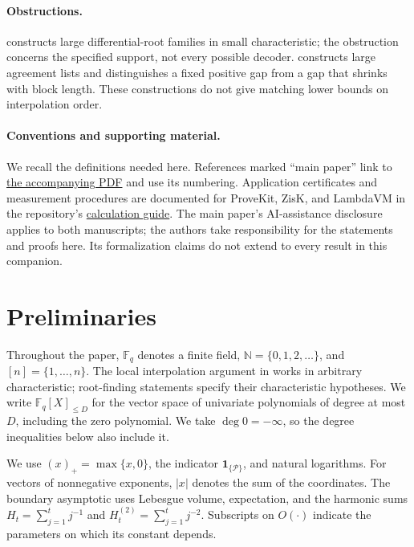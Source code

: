 \documentclass[11pt,letterpaper]{article}
\theoremstyle{definition}
\newcommand{\F}{\mathbb{F}}
\newcommand{\N}{\mathbb{N}}
\begin{document}
\paragraph{Obstructions.}
 constructs large differential-root families in
small characteristic; the obstruction concerns the specified support,
not every possible decoder.  constructs large agreement
lists and distinguishes a fixed positive gap from a gap that shrinks with
block length. These constructions do not give matching lower bounds on
interpolation order.

\paragraph{Conventions and supporting material.}
We recall the definitions needed here. References marked ``main paper''
link to \href{rs-beyond-johnson.pdf}{the accompanying PDF} and use its
numbering. Application certificates and measurement procedures are documented
for ProveKit, ZisK, and LambdaVM in the repository's
\href{https://github.com/quangvdao/rs-beyond-johnson/blob/main/CALCULATIONS.md}{calculation guide}. The main paper's AI-assistance disclosure applies
to both manuscripts; the authors take responsibility for the statements and
proofs here. Its formalization claims do not extend to every result in this
companion.

{\small\setcounter{tocdepth}{1}\tableofcontents}
 \section{Preliminaries}
\label{sec:preliminaries}

Throughout the paper, \(\F_q\) denotes a finite field,
\(\N=\{0,1,2,\ldots\}\), and \([n]=\{1,\ldots,n\}\).
The local interpolation argument in
 works in arbitrary
characteristic; root-finding statements specify their characteristic
hypotheses.  We write \(\F_q[X]_{\leq D}\) for the vector space of univariate
polynomials of degree at most \(D\), including the zero polynomial.
We take $\deg 0=-\infty$, so the degree inequalities below also include it.

We use $(x)_+=\max\{x,0\}$, the indicator $\mathbf1_{\{\mathcal P\}}$,
and natural logarithms. For vectors of nonnegative exponents, $|x|$ denotes
the sum of the coordinates. The boundary asymptotic uses Lebesgue volume,
expectation, and the harmonic sums
$H_t=\sum_{j=1}^t j^{-1}$ and $H_t^{(2)}=\sum_{j=1}^t j^{-2}$.
Subscripts on $O(\cdot)$ indicate the parameters on which its constant depends.
\end{document}
